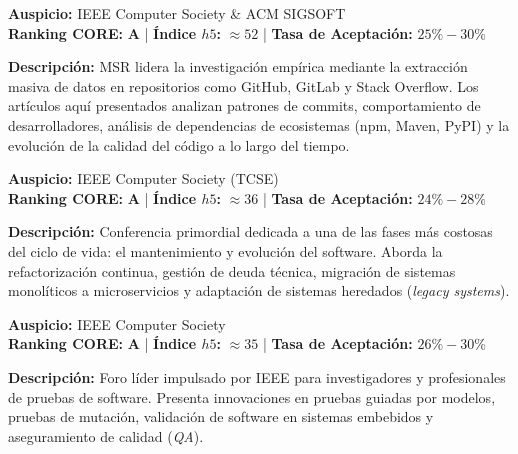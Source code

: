 \documentclass[12pt,a4paper]{article}
\begin{document}
\begin{tcolorbox}[colback=white,colframe=tierA,title={\textbf{6. MSR -- International Conference on Mining Software Repositories}},fonttitle=\bfseries]
\textbf{Auspicio:} IEEE Computer Society \& ACM SIGSOFT \\
\textbf{Ranking CORE:} \textbf{A} \quad | \quad \textbf{Índice $h5$:} $\approx 52$ \quad | \quad \textbf{Tasa de Aceptación:} $25\% - 30\%$
\end{tcolorbox}
\textbf{Descripción:} MSR lidera la investigación empírica mediante la extracción masiva de datos en repositorios como GitHub, GitLab y Stack Overflow. Los artículos aquí presentados analizan patrones de commits, comportamiento de desarrolladores, análisis de dependencias de ecosistemas (npm, Maven, PyPI) y la evolución de la calidad del código a lo largo del tiempo.

\vspace{0.3cm}

\begin{tcolorbox}[colback=white,colframe=tierA,title={\textbf{7. ICSME -- IEEE International Conference on Software Maintenance and Evolution}},fonttitle=\bfseries]
\textbf{Auspicio:} IEEE Computer Society (TCSE) \\
\textbf{Ranking CORE:} \textbf{A} \quad | \quad \textbf{Índice $h5$:} $\approx 36$ \quad | \quad \textbf{Tasa de Aceptación:} $24\% - 28\%$
\end{tcolorbox}
\textbf{Descripción:} Conferencia primordial dedicada a una de las fases más costosas del ciclo de vida: el mantenimiento y evolución del software. Aborda la refactorización continua, gestión de deuda técnica, migración de sistemas monolíticos a microservicios y adaptación de sistemas heredados (\textit{legacy systems}).

\vspace{0.3cm}

\begin{tcolorbox}[colback=white,colframe=tierA,title={\textbf{8. ICST -- IEEE International Conference on Software Testing, Verification and Validation}},fonttitle=\bfseries]
\textbf{Auspicio:} IEEE Computer Society \\
\textbf{Ranking CORE:} \textbf{A} \quad | \quad \textbf{Índice $h5$:} $\approx 35$ \quad | \quad \textbf{Tasa de Aceptación:} $26\% - 30\%$
\end{tcolorbox}
\textbf{Descripción:} Foro líder impulsado por IEEE para investigadores y profesionales de pruebas de software. Presenta innovaciones en pruebas guiadas por modelos, pruebas de mutación, validación de software en sistemas embebidos y aseguramiento de calidad (\textit{QA}).
\end{document}
